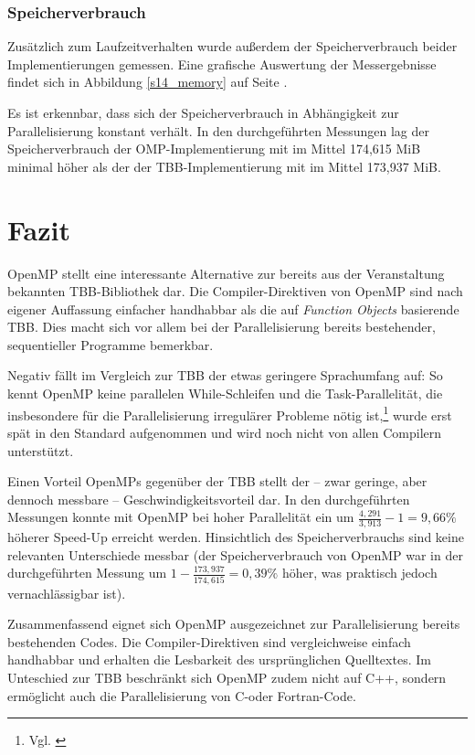 \documentclass[11pt]{scrartcl}
\begin{document}
\subsubsection{Speicherverbrauch}

Zusätzlich zum Laufzeitverhalten wurde außerdem der Speicherverbrauch beider Implementierungen gemessen. Eine grafische Auswertung der Messergebnisse findet sich in Abbildung \ref{s14_memory} auf Seite \pageref{s14_memory}.

Es ist erkennbar, dass sich der Speicherverbrauch in Abhängigkeit zur Parallelisierung konstant verhält. In den durchgeführten Messungen lag der Speicherverbrauch der OMP-Implementierung mit im Mittel 174,615 MiB minimal höher als der der TBB-Implementier\-ung mit im Mittel 173,937 MiB.

\section{Fazit}

OpenMP stellt eine interessante Alternative zur bereits aus der Veranstaltung bekannten TBB-Bibliothek dar. Die Compiler-Direktiven von OpenMP sind nach eigener Auffassung einfacher handhabbar als die auf \emph{Function Objects} basierende TBB. Dies macht sich vor allem bei der Parallelisierung bereits bestehender, sequentieller Programme bemerkbar.

Negativ fällt im Vergleich zur TBB der etwas geringere Sprachumfang auf: So kennt OpenMP keine parallelen While-Schleifen und die Task-Parallelität, die insbesondere für die Parallelisierung irregulärer Probleme nötig ist,\footnote{Vgl. \cite[S.~6]{duran_tasking_2009}} wurde erst spät in den Standard aufgenommen und wird noch nicht von allen Compilern unterstützt.

Einen Vorteil OpenMPs gegenüber der TBB stellt der -- zwar geringe, aber dennoch messbare -- Geschwindigkeitsvorteil dar. In den durchgeführten Messungen konnte mit OpenMP bei hoher Parallelität ein um $\frac{4,291}{3,913}-1 = 9,66\%$ höherer Speed-Up erreicht werden. Hinsichtlich des Speicherverbrauchs sind keine relevanten Unterschiede messbar (der Speicherverbrauch von OpenMP war in der durchgeführten Messung um $1-\frac{173,937}{174,615} = 0,39\%$ höher, was praktisch jedoch vernachlässigbar ist).

Zusammenfassend eignet sich OpenMP ausgezeichnet zur Parallelisierung bereits besteh\-enden Codes. Die Compiler-Direktiven sind vergleichweise einfach handhabbar und erhalten die Lesbarkeit des ursprünglichen Quelltextes. Im Unteschied zur TBB beschränkt sich OpenMP zudem nicht auf C++, sondern ermöglicht auch die Parallelisierung von C-oder Fortran-Code.
\end{document}
